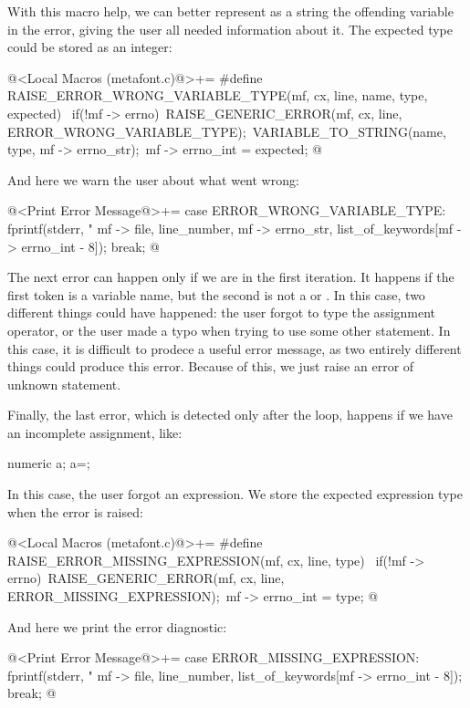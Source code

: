 With this macro help, we can better represent as a string the
offending variable in the error, giving the user all needed
information about it. The expected type could be stored as an integer:

\iniciocodigo
@<Local Macros (metafont.c)@>+=
#define RAISE_ERROR_WRONG_VARIABLE_TYPE(mf, cx, line, name, type, expected) {\
  if(!mf -> errno){\
    RAISE_GENERIC_ERROR(mf, cx, line, ERROR_WRONG_VARIABLE_TYPE);\
    VARIABLE_TO_STRING(name, type, mf -> errno_str);\
    mf -> errno_int = expected;}}
@
\fimcodigo

And here we warn the user about what went wrong:

\iniciocodigo
@<Print Error Message@>+=
case ERROR_WRONG_VARIABLE_TYPE:
  fprintf(stderr, "%
          mf -> file, line_number, mf -> errno_str,
          list_of_keywords[mf -> errno_int - 8]);
  break;
@
\fimcodigo

The next error can happen only if we are in the first iteration. It
happens if the first token is a variable name, but the second is not
a \monoespaco{=} or \monoespaco{:=}. In this case, two different
things could have happened: the user forgot to type the assignment
operator, or the user made a typo when trying to use some other
statement. In this case, it is difficult to prodece a useful error
message, as two entirely different things could produce this
error. Because of this, we just raise an error of unknown statement.

Finally, the last error, which is detected only after the loop,
happens if we have an incomplete assignment, like:

\alinhaverbatim
numeric a;
a=;
\alinhanormal

In this case, the user forgot an expression. We store the expected
expression type when the error is raised:

\iniciocodigo
@<Local Macros (metafont.c)@>+=
#define RAISE_ERROR_MISSING_EXPRESSION(mf, cx, line, type) {\
  if(!mf -> errno){\
    RAISE_GENERIC_ERROR(mf, cx, line, ERROR_MISSING_EXPRESSION);\
    mf -> errno_int = type;}}
@
\fimcodigo

And here we print the error diagnostic:

\iniciocodigo
@<Print Error Message@>+=
case ERROR_MISSING_EXPRESSION:
  fprintf(stderr, "%
          mf -> file, line_number, list_of_keywords[mf -> errno_int - 8]);
  break;
@
\fimcodigo


